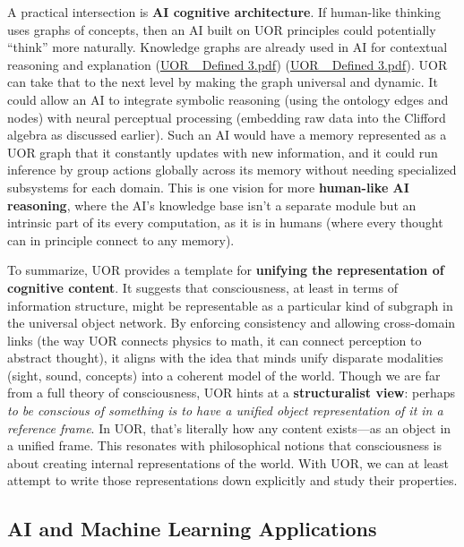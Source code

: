 \documentclass[12pt]{article}
\begin{document}
\medskip

A practical intersection is \textbf{AI cognitive architecture}. If human-like thinking uses graphs of concepts, then an AI built on UOR principles could potentially ``think'' more naturally. Knowledge graphs are already used in AI for contextual reasoning and explanation (\href{file://file-3oEyMHjK5WgHWfYmLyzhts#:~:text=%E2%97%8F%20Artificial%20Intelligence%20Integration%3A%20In,Consider%20an}{UOR\_ Defined 3.pdf}) (\href{file://file-3oEyMHjK5WgHWfYmLyzhts#:~:text=The%20clarity%20and%20consistency%20of,ethics%20and%20philosophy%20of%20mind}{UOR\_ Defined 3.pdf}). UOR can take that to the next level by making the graph universal and dynamic. It could allow an AI to integrate symbolic reasoning (using the ontology edges and nodes) with neural perceptual processing (embedding raw data into the Clifford algebra as discussed earlier). Such an AI would have a memory represented as a UOR graph that it constantly updates with new information, and it could run inference by group actions globally across its memory without needing specialized subsystems for each domain. This is one vision for more \textbf{human-like AI reasoning}, where the AI’s knowledge base isn’t a separate module but an intrinsic part of its every computation, as it is in humans (where every thought can in principle connect to any memory).

\medskip

To summarize, UOR provides a template for \textbf{unifying the representation of cognitive content}. It suggests that consciousness, at least in terms of information structure, might be representable as a particular kind of subgraph in the universal object network. By enforcing consistency and allowing cross-domain links (the way UOR connects physics to math, it can connect perception to abstract thought), it aligns with the idea that minds unify disparate modalities (sight, sound, concepts) into a coherent model of the world. Though we are far from a full theory of consciousness, UOR hints at a \textbf{structuralist view}: perhaps \emph{to be conscious of something is to have a unified object representation of it in a reference frame}. In UOR, that’s literally how any content exists---as an object in a unified frame. This resonates with philosophical notions that consciousness is about creating internal representations of the world. With UOR, we can at least attempt to write those representations down explicitly and study their properties.

\subsection{AI and Machine Learning Applications}
\end{document}
